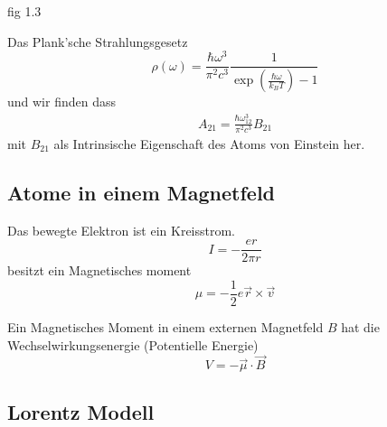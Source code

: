 fig 1.3

Das Plank'sche Strahlungsgesetz
$$
\rho(\omega) = \frac{\hbar \omega^3}{\pi^2 c^3} \frac{1}{\exp\left(\frac{\hbar\omega}{k_BT}\right)-1}
$$
und wir finden dass
\begin{gather}
	A_{21} = \frac{\hbar\omega_{12}^3}{\pi^2 c^3} B_{21}
\end{gather}
mit $B_{21}$ als Intrinsische Eigenschaft des Atoms von Einstein her.

\subsection{Atome in einem Magnetfeld}

Das bewegte Elektron ist ein Kreisstrom.
$$
I = -\frac{er}{2\pi r}
$$
besitzt ein Magnetisches moment
$$
\mu = -\frac{1}{2}e\vec r\times \vec v
$$

Ein Magnetisches Moment in einem externen Magnetfeld $B$ hat die Wechselwirkungsenergie (Potentielle Energie)
$$
V = -\vec\mu \cdot\vec B
$$

\subsection{Lorentz Modell}

